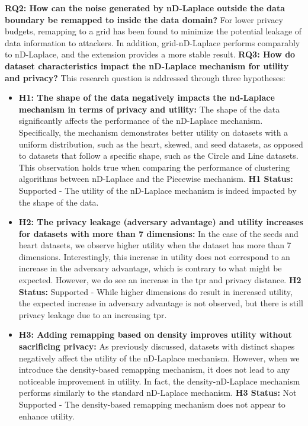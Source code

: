 \textbf{RQ2: How can the noise generated by nD-Laplace outside the data boundary be remapped to inside the data domain?} \newline
For lower privacy budgets, remapping to a grid has been found to minimize the potential leakage of data information to attackers.
In addition, grid-nD-Laplace performs comparably to nD-Laplace, and the extension provides a more stable result. \newline
\textbf{RQ3: How do dataset characteristics impact the nD-Laplace mechanism for utility and privacy?} \newline
This research question is addressed through three hypotheses: \newline
\begin{itemize}
	\item \textbf{H1: The shape of the data negatively impacts the nd-Laplace mechanism in terms of privacy and utility:}
	The shape of the data significantly affects the performance of the nD-Laplace mechanism. Specifically, the mechanism demonstrates better utility on datasets with a uniform distribution, such as the heart, skewed, and seed datasets, as opposed to datasets that follow a specific shape, such as the Circle and Line datasets. This observation holds true when comparing the performance of clustering algorithms between nD-Laplace and the Piecewise mechanism. \newline  \textbf{H1 Status:} Supported - The utility of the nD-Laplace mechanism is indeed impacted by the shape of the data.
	\item \textbf{H2: The privacy leakage (adversary advantage) and utility increases for datasets with more than 7 dimensions:}
	      In the case of the seeds and heart datasets, we observe higher utility when the dataset has more than 7 dimensions. Interestingly, this increase in utility does not correspond to an increase in the adversary advantage, which is contrary to what might be expected. However, we do see an increase in the \gls{tpr} and privacy distance. \newline \textbf{H2 Status:} Supported - While higher dimensions do result in increased utility, the expected increase in adversary advantage is not observed, but there is still privacy leakage due to an increasing \gls{tpr}.
	\item \textbf{H3: Adding remapping based on density improves utility without sacrificing privacy:}
	     As previously discussed, datasets with distinct shapes negatively affect the utility of the nD-Laplace mechanism. However, when we introduce the density-based remapping mechanism, it does not lead to any noticeable improvement in utility. In fact, the density-nD-Laplace mechanism performs similarly to the standard nD-Laplace mechanism. \newline \textbf{H3 Status:} Not Supported - The density-based remapping mechanism does not appear to enhance utility.
\end{itemize}
